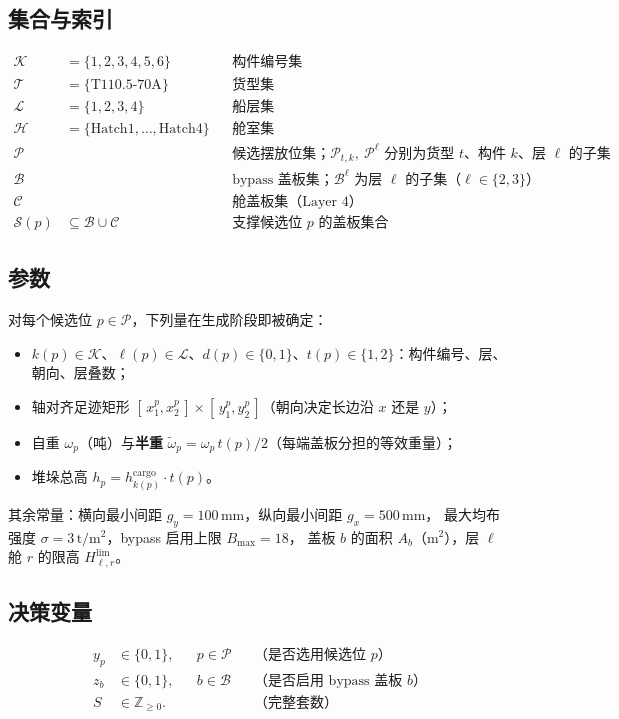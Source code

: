 \documentclass[11pt]{article}
\newcommand{\unit}[1]{\,\mathrm{#1}}
\begin{document}
\subsection{集合与索引}
\begin{align*}
\mathcal{K} &= \{1,2,3,4,5,6\} && \text{构件编号集} \\
\mathcal{T} &= \{\text{T110.5-70A}\} && \text{货型集} \\
\mathcal{L} &= \{1,2,3,4\} && \text{船层集} \\
\mathcal{H} &= \{\text{Hatch1},\dots,\text{Hatch4}\} && \text{舱室集} \\
\mathcal{P} &  && \text{候选摆放位集；} \mathcal{P}_{t,k},\ \mathcal{P}^{\ell} \text{ 分别为货型 } t\text{、构件 } k\text{、层 } \ell \text{ 的子集} \\
\mathcal{B} &  && \text{bypass 盖板集；} \mathcal{B}^{\ell} \text{ 为层 } \ell \text{ 的子集（}\ell\in\{2,3\}\text{）} \\
\mathcal{C} &  && \text{舱盖板集（Layer~4）} \\
\mathcal{S}(p) & \subseteq \mathcal{B}\cup\mathcal{C} && \text{支撑候选位 } p \text{ 的盖板集合}
\end{align*}

\subsection{参数}
对每个候选位 $p\in\mathcal{P}$，下列量在生成阶段即被确定：
\begin{itemize}[leftmargin=1.8em,itemsep=2pt]
  \item $k(p)\in\mathcal{K}$、$\ell(p)\in\mathcal{L}$、$d(p)\in\{0,1\}$、$t(p)\in\{1,2\}$：构件编号、层、朝向、层叠数；
  \item 轴对齐足迹矩形 $[\,x_1^p,x_2^p\,]\times[\,y_1^p,y_2^p\,]$（朝向决定长边沿 $x$ 还是 $y$）；
  \item 自重 $\omega_p$（吨）与\textbf{半重} $\tilde\omega_p = \omega_p\, t(p)/2$（每端盖板分担的等效重量）；
  \item 堆垛总高 $h_p = h^{\text{cargo}}_{k(p)}\cdot t(p)$。
\end{itemize}
其余常量：横向最小间距 $g_y=100\unit{mm}$，纵向最小间距 $g_x=500\unit{mm}$，
最大均布强度 $\sigma = 3\unit{t/m^2}$，bypass 启用上限 $B_{\max}=18$，
盖板 $b$ 的面积 $A_b$（$\mathrm{m}^2$），层 $\ell$ 舱 $r$ 的限高 $H^{\lim}_{\ell,r}$。

\subsection{决策变量}
\begin{align}
y_p &\in \{0,1\}, & & p\in\mathcal{P} && \text{（是否选用候选位 } p\text{）}\\
z_b &\in \{0,1\}, & & b\in\mathcal{B} && \text{（是否启用 bypass 盖板 } b\text{）}\\
S   &\in \mathbb{Z}_{\ge 0}. & & && \text{（完整套数）}
\end{align}
\end{document}
